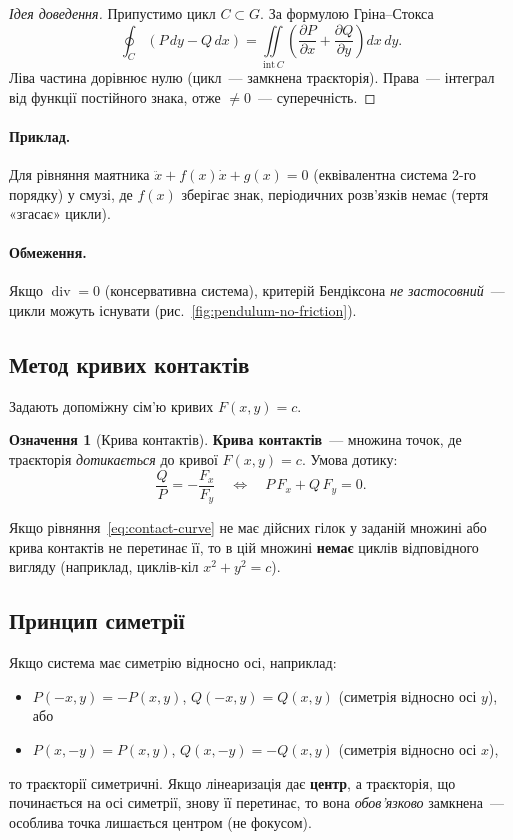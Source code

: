 \documentclass[12pt,a4paper]{article}
\theoremstyle{definition}
\newtheorem{ozn}{Означення}[section]
\theoremstyle{plain}
\begin{document}
\begin{proof}[Ідея доведення]
Припустимо цикл $C\subset G$. За формулою Гріна--Стокса
\[
  \oint_C (P\,dy - Q\,dx)
  = \iint\limits_{\mathrm{int}\,C}
    \left(\frac{\partial P}{\partial x}+\frac{\partial Q}{\partial y}\right) dx\,dy .
\]
Ліва частина дорівнює нулю (цикл~--- замкнена траєкторія). Права~--- інтеграл
від функції постійного знака, отже $\neq0$~--- суперечність.
\end{proof}

\paragraph{Приклад.} Для рівняння маятника
$\ddot x + f(x)\dot x + g(x)=0$ (еквівалентна система 2-го порядку) у смузі,
де $f(x)$ зберігає знак, періодичних розв'язків немає (тертя «згасає» цикли).

\paragraph{Обмеження.} Якщо $\operatorname{div}=0$ (консервативна система),
критерій Бендіксона \emph{не застосовний}~--- цикли можуть існувати
(рис.~\ref{fig:pendulum-no-friction}).

\subsection{Метод кривих контактів}

Задають допоміжну сім'ю кривих $F(x,y)=c$.

\begin{ozn}[Крива контактів]
\textbf{Крива контактів}~--- множина точок, де траєкторія \emph{дотикається}
до кривої $F(x,y)=c$. Умова дотику:
\begin{equation}
  \frac{Q}{P} = -\frac{F_x}{F_y}
  \quad\Longleftrightarrow\quad
  P\,F_x + Q\,F_y = 0.
  \label{eq:contact-curve}
\end{equation}
\end{ozn}

Якщо рівняння~\eqref{eq:contact-curve} не має дійсних гілок у заданій
множині або крива контактів не перетинає її, то в цій множині \textbf{немає}
циклів відповідного вигляду (наприклад, циклів-кіл $x^2+y^2=c$).

\subsection{Принцип симетрії}

Якщо система має симетрію відносно осі, наприклад:
\begin{itemize}[leftmargin=1.4em]
  \item $P(-x,y)=-P(x,y)$, $Q(-x,y)=Q(x,y)$ (симетрія відносно осі $y$), або
  \item $P(x,-y)=P(x,y)$, $Q(x,-y)=-Q(x,y)$ (симетрія відносно осі $x$),
\end{itemize}
то траєкторії симетричні. Якщо лінеаризація дає \textbf{центр}, а траєкторія,
що починається на осі симетрії, знову її перетинає, то вона \emph{обов'язково}
замкнена~--- особлива точка лишається центром (не фокусом).
\end{document}
